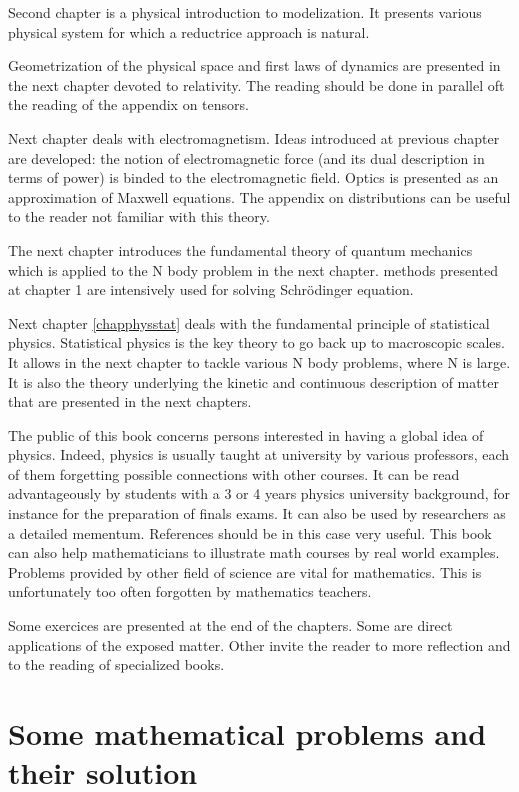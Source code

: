 \documentclass[12pt]{book}
\begin{document}
Second chapter is a physical introduction to modelization. It presents various
physical system for which a reductrice approach is natural. 

Geometrization of the physical space and first laws of dynamics are presented
in the next chapter devoted to relativity. The reading should be done in
parallel oft the reading of the appendix on tensors.

Next chapter deals with electromagnetism. Ideas introduced at previous chapter
are developed: the notion of electromagnetic force (and its dual description in
terms of power) is binded to the electromagnetic field.
Optics is presented as an approximation of Maxwell equations. The appendix on
distributions can be useful to the reader not familiar with this theory.

The next chapter introduces the fundamental theory of quantum mechanics which
is applied to the N body problem in the next chapter. methods presented at
chapter 1 are intensively used for solving Schr\"odinger equation.

Next chapter \ref{chapphysstat} deals with the fundamental principle
of statistical 
physics. Statistical physics is the key theory to go back up to macroscopic
scales. It allows  in the next chapter to tackle various N body problems,
where N is large.
It is also the theory underlying the kinetic and continuous description of
matter that are presented in the next chapters.

The public of this book concerns persons interested in having a global idea of
physics. Indeed, physics is usually taught at university by various
professors, each of them forgetting possible connections with other
courses. It can be read advantageously by students with a 3 or 4 years
physics university background, for instance for the preparation of finals
exams. It can also be used by researchers as a detailed mementum. References
should be in this case very useful. This book can also help mathematicians to
illustrate math courses by 
real world examples. Problems provided by other field of science are vital for
mathematics. This is unfortunately too often forgotten by mathematics
teachers. 

Some exercices are presented at the end of the chapters. Some are direct
applications of the exposed matter. Other invite the reader to more reflection
and to the reading of specialized books.




\chapter{Some mathematical problems and their solution}\label{chapprob}
\end{document}
